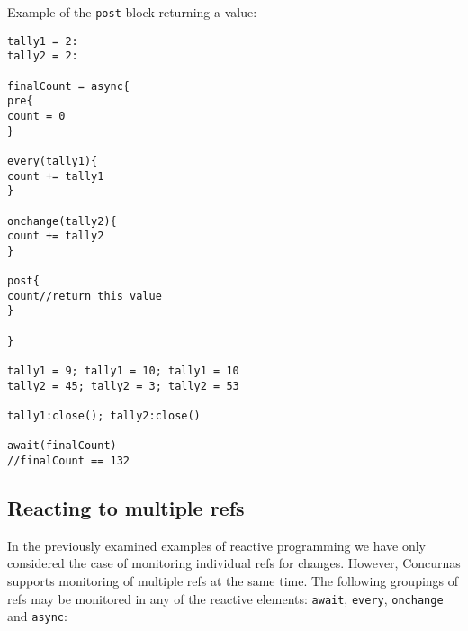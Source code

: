 \documentclass[conc-doc]{subfiles}
\begin{document}
Example of the \lstinline{post} block returning a value:
\begin{lstlisting}
tally1 = 2:
tally2 = 2:

finalCount = async{
pre{
count = 0
}

every(tally1){
count += tally1
}		

onchange(tally2){
count += tally2		
}

post{
count//return this value
}

}

tally1 = 9; tally1 = 10; tally1 = 10
tally2 = 45; tally2 = 3; tally2 = 53

tally1:close(); tally2:close()

await(finalCount)
//finalCount == 132
\end{lstlisting}


\subsection{Reacting to multiple refs}
In the previously examined examples of reactive programming we have only considered the case of monitoring individual refs for changes. However, Concurnas supports monitoring of multiple refs at the same time. The following groupings of refs may be monitored in any of the reactive elements: \lstinline{await}, \lstinline{every}, \lstinline{onchange} and \lstinline{async}:
\end{document}
